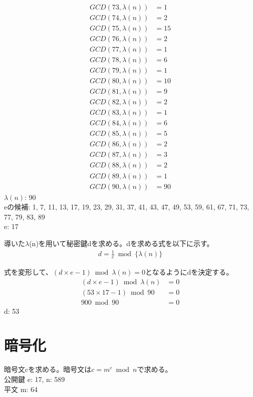 \documentclass[uplatex]{jsarticle}
\begin{document}
\begin{align*}
GCD(73, \lambda(n))&= 1\\
GCD(74, \lambda(n))&= 2\\
GCD(75, \lambda(n))&= 15\\
GCD(76, \lambda(n))&= 2\\
GCD(77, \lambda(n))&= 1\\
GCD(78, \lambda(n))&= 6\\
GCD(79, \lambda(n))&= 1\\
GCD(80, \lambda(n))&= 10\\
GCD(81, \lambda(n))&= 9\\
GCD(82, \lambda(n))&= 2\\
GCD(83, \lambda(n))&= 1\\
GCD(84, \lambda(n))&= 6\\
GCD(85, \lambda(n))&= 5\\
GCD(86, \lambda(n))&= 2\\
GCD(87, \lambda(n))&= 3\\
GCD(88, \lambda(n))&= 2\\
GCD(89, \lambda(n))&= 1\\
GCD(90, \lambda(n))&= 90
\end{align*}
$\lambda(n)$: 90\\
eの候補: 1, 7, 11, 13, 17, 19, 23, 29, 31, 37, 41, 43, 47, 49, 53, 59, 61, 67, 71, 73, 77, 79, 83, 89\\
e: 17

導いた$\lambda$(n)を用いて秘密鍵dを求める。dを求める式を以下に示す。
\begin{align*}
  d = \frac{1}{e} \bmod \{\lambda(n)\}
\end{align*}

式を変形して、$(d \times e - 1) \bmod \lambda(n) = 0$となるようにdを決定する。
\begin{align*}
  (d \times e - 1) \bmod \lambda(n)&= 0\\
  (53 \times 17 - 1) \bmod 90&= 0\\
  900 \bmod 90 &=0
\end{align*}
d: 53


\section{暗号化}
暗号文cを求める。暗号文は$c = m^e \bmod n$で求める。\\
公開鍵 e: 17, n: 589\\
平文 m: 64
\end{document}
